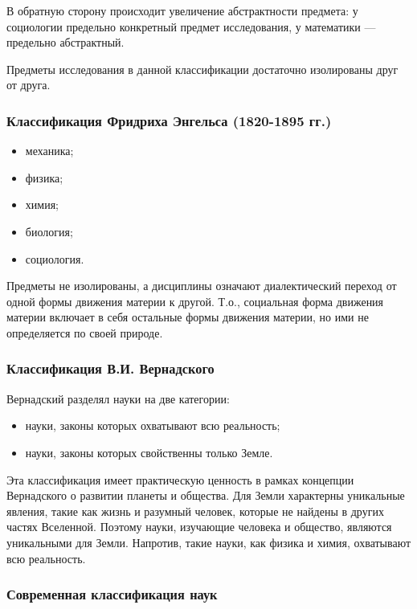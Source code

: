 В обратную сторону происходит
увеличение абстрактности предмета: у социологии предельно конкретный предмет
исследования, у математики --- предельно абстрактный. 

Предметы исследования в данной классификации достаточно изолированы друг от друга. 

\subsubsection {Классификация Фридриха Энгельса (1820-1895 гг.)} 

\begin{itemize}
    \item механика;
    \item физика;
    \item химия; 
    \item биология; 
    \item социология. 
\end{itemize}

Предметы не изолированы, а
дисциплины означают диалектический переход от одной формы движения материи к другой.
Т.о., социальная форма движения
материи включает в себя остальные формы движения материи, но ими
не определяется по своей природе. 


\subsubsection{Классификация В.И. Вернадского}

Вернадский разделял науки на две категории:
\begin{itemize}
    \item науки, законы которых охватывают всю реальность;
    \item науки, законы которых свойственны только Земле.
\end{itemize}

Эта классификация имеет практическую ценность в рамках концепции Вернадского о развитии планеты и общества. Для Земли характерны уникальные явления, такие как жизнь и разумный человек, которые не найдены в других частях Вселенной. Поэтому науки, изучающие человека и общество, являются уникальными для Земли. Напротив, такие науки, как физика и химия, охватывают всю реальность. 

\subsubsection{Современная классификация наук} 

